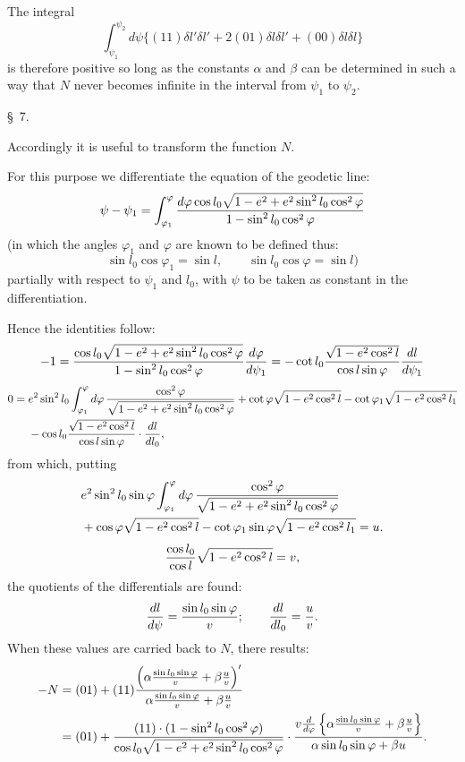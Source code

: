 The integral
\[
 \int_{\psi_1}^{\psi_2}d\psi\{(11)\delta l'\delta l'+2(01)\delta l\delta l'+(00)\delta l\delta l\}
\]
is therefore positive so long as the constants $\alpha$ and $\beta$ can be determined in such a way that $N$ never becomes infinite in the interval from $\psi_1$ to $\psi_2$.

\begin{center}\S\ 7.\end{center}

Accordingly it is useful to transform the function $N$.

For this purpose we differentiate the equation of the geodetic line:
\[
 \psi-\psi_1=\int_{\varphi_1}^{\varphi}{d\varphi\cos l_0\sqrt{1-e^2+e^2\sin^2l_0\cos^2\varphi}\over 1-\sin^2l_0\cos^2\varphi}
\]
(in which the angles $\varphi_1$ and $\varphi$ are known to be defined thus:
\[
 \sin l_0\cos\varphi_1=\sin l,
 \qquad \sin l_0\cos\varphi=\sin l)
\]
partially with respect to $\psi_1$ and $l_0$, with $\psi$ to be taken as constant in the differentiation.

Hence the identities follow:
\[
 -1={\cos l_0\sqrt{1-e^2+e^2\sin^2l_0\cos^2\varphi}\over 1-\sin^2l_0\cos^2\varphi}{d\varphi\over d\psi_1}
 =-\cot l_0{\sqrt{1-e^2\cos^2l}\over \cos l\sin\varphi}{dl\over d\psi_1}
\]
\[
\begin{aligned}
0={}&e^2\sin^2l_0\int_{\varphi_1}^{\varphi}d\varphi\,{\cos^2\varphi\over \sqrt{1-e^2+e^2\sin^2l_0\cos^2\varphi}}
       +\cot\varphi\sqrt{1-e^2\cos^2l}-\cot\varphi_1\sqrt{1-e^2\cos^2l_1} \\
&{}-\cos l_0{\sqrt{1-e^2\cos^2l}\over \cos l\sin\varphi}\cdot {dl\over dl_0},
\end{aligned}
\]
from which, putting
\[
\begin{aligned}
&e^2\sin^2l_0\sin\varphi\int_{\varphi_1}^{\varphi}d\varphi\,{\cos^2\varphi\over \sqrt{1-e^2+e^2\sin^2l_0\cos^2\varphi}}\\
&{}+\cos\varphi\sqrt{1-e^2\cos^2l}-\cot\varphi_1\sin\varphi\sqrt{1-e^2\cos^2l_1}=u.
\end{aligned}
\]
\[
 {\cos l_0\over \cos l}\sqrt{1-e^2\cos^2l}=v,
\]
the quotients of the differentials are found:
\[
 {dl\over d\psi}={\sin l_0\sin\varphi\over v};\qquad {dl\over dl_0}={u\over v}.
\]
When these values are carried back to $N$, there results:
\[
\begin{aligned}
-N&=(01)+(11){\left({\alpha{\sin l_0\sin\varphi\over v}+\beta{u\over v}}\right)'
\over {\alpha{\sin l_0\sin\varphi\over v}+\beta{u\over v}}}\\
&=(01)+{(11)\cdot(1-\sin^2l_0\cos^2\varphi)\over \cos l_0\sqrt{1-e^2+e^2\sin^2l_0\cos^2\varphi}}
\cdot {v{d\over d\varphi}\left\{\alpha{\sin l_0\sin\varphi\over v}+\beta{u\over v}\right\}
\over \alpha\sin l_0\sin\varphi+\beta u}.
\end{aligned}
\]
